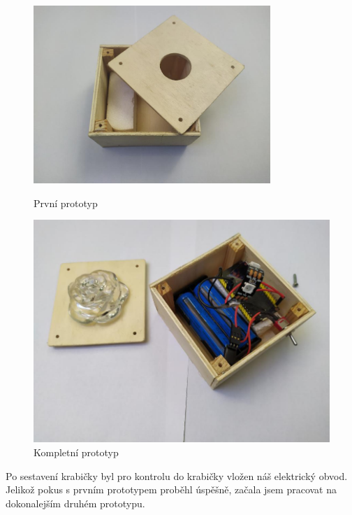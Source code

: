 \begin{figure}[htbp]
	\centering
	\begin{minipage}[b]{0.5\textwidth}
		\centering
		\includegraphics[width=0.8\textwidth]{img/06zakl/Amazakladna.jpg}
		\caption{První prototyp}
	\end{minipage}
	\qquad
	\begin{minipage}[b]{0.4\textwidth}
		\centering
		\includegraphics[width=1\textwidth]{img/06zakl/1prototypele.jpg}
		\caption{Kompletní  prototyp}
	\end{minipage}
\end{figure}

Po sestavení krabičky byl pro kontrolu do krabičky vložen náš elektrický obvod.
Jelikož pokus s prvním prototypem proběhl úspěšně, začala jsem pracovat na dokonalejším druhém prototypu.


